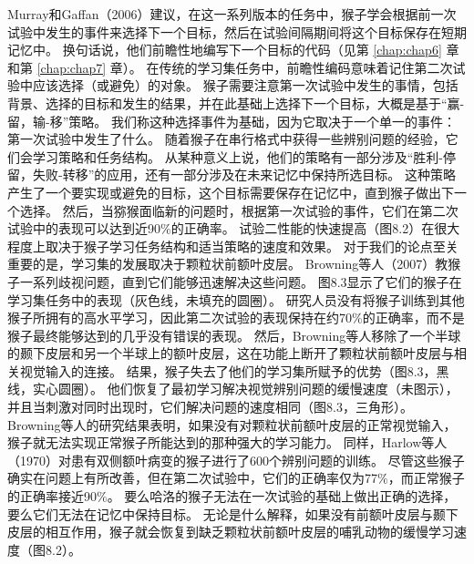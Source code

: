 Murray和Gaffan（2006）建议，在这一系列版本的任务中，猴子学会根据前一次试验中发生的事件来选择下一个目标，然后在试验间隔期间将这个目标保存在短期记忆中。
换句话说，他们前瞻性地编写下一个目标的代码（见第 \ref{chap:chap6} 章和第 \ref{chap:chap7} 章）。
在传统的学习集任务中，前瞻性编码意味着记住第二次试验中应该选择（或避免）的对象。
猴子需要注意第一次试验中发生的事情，包括背景、选择的目标和发生的结果，并在此基础上选择下一个目标，大概是基于“赢-留，输-移”策略。
我们称这种选择事件为基础，因为它取决于一个单一的事件：第一次试验中发生了什么。
随着猴子在串行格式中获得一些辨别问题的经验，它们会学习策略和任务结构。
从某种意义上说，他们的策略有一部分涉及“胜利-停留，失败-转移”的应用，还有一部分涉及在未来记忆中保持所选目标。
这种策略产生了一个要实现或避免的目标，这个目标需要保存在记忆中，直到猴子做出下一个选择。
然后，当猕猴面临新的问题时，根据第一次试验的事件，它们在第二次试验中的表现可以达到近90$\%$的正确率。
试验二性能的快速提高（图8.2）在很大程度上取决于猴子学习任务结构和适当策略的速度和效果。
对于我们的论点至关重要的是，学习集的发展取决于颗粒状前额叶皮层。
Browning等人（2007）教猴子一系列歧视问题，直到它们能够迅速解决这些问题。
图8.3显示了它们的猴子在学习集任务中的表现（灰色线，未填充的圆圈）。
研究人员没有将猴子训练到其他猴子所拥有的高水平学习，因此第二次试验的表现保持在约70$\%$的正确率，而不是猴子最终能够达到的几乎没有错误的表现。
然后，Browning等人移除了一个半球的颞下皮层和另一个半球上的额叶皮层，这在功能上断开了颗粒状前额叶皮层与相关视觉输入的连接。
结果，猴子失去了他们的学习集所赋予的优势（图8.3，黑线，实心圆圈）。
他们恢复了最初学习解决视觉辨别问题的缓慢速度（未图示），并且当刺激对同时出现时，它们解决问题的速度相同（图8.3，三角形）。
Browning等人的研究结果表明，如果没有对颗粒状前额叶皮层的正常视觉输入，猴子就无法实现正常猴子所能达到的那种强大的学习能力。
同样，Harlow等人（1970）对患有双侧额叶病变的猴子进行了600个辨别问题的训练。
尽管这些猴子确实在问题上有所改善，但在第二次试验中，它们的正确率仅为77$\%$，而正常猴子的正确率接近90$\%$。
要么哈洛的猴子无法在一次试验的基础上做出正确的选择，要么它们无法在记忆中保持目标。
无论是什么解释，如果没有前额叶皮层与颞下皮层的相互作用，猴子就会恢复到缺乏颗粒状前额叶皮层的哺乳动物的缓慢学习速度（图8.2）。


